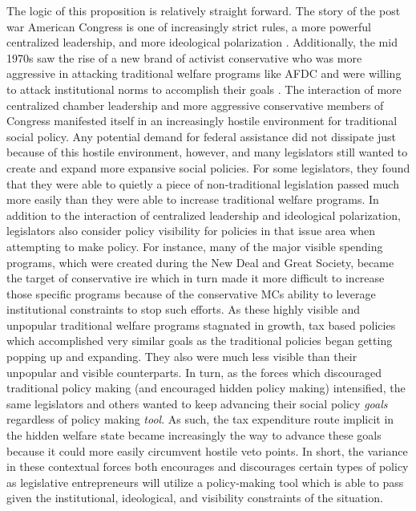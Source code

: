 \documentclass[12pt]{article}
\begin{document}
The logic of this proposition is relatively straight forward. The story of the post war American Congress is one of increasingly strict rules, a more powerful centralized leadership, and more ideological polarization \citep{rohde1991, binder2003}. Additionally, the mid 1970s saw the rise of a new brand of activist conservative who was more aggressive in attacking traditional welfare programs like AFDC and were willing to attack institutional norms to accomplish their goals \citep{hacker2007, theriault2013}. The interaction of more centralized chamber leadership and more aggressive conservative members of Congress manifested itself in an increasingly hostile environment for traditional social policy. Any potential demand for federal assistance did not dissipate just because of this hostile environment, however, and many legislators still wanted to create and expand more expansive social policies. For some legislators, they found that they were able to quietly a piece of non-traditional legislation passed much more easily than they were able to increase traditional welfare programs. In addition to the interaction of centralized leadership and ideological polarization, legislators also consider policy visibility for policies in that issue area when attempting to make policy. For instance, many of the major visible spending programs, which were created during the New Deal and Great Society, became the target of conservative ire which in turn made it more difficult to increase those specific programs because of the conservative MCs ability to leverage institutional constraints to stop such efforts. As these highly visible and unpopular traditional welfare programs stagnated in growth, tax based policies which accomplished very similar goals as the traditional policies began getting popping up and expanding. They also were much less visible than their unpopular and visible counterparts. In turn, as the forces which discouraged traditional policy making (and encouraged hidden policy making) intensified, the same legislators and others wanted to keep advancing their social policy \emph{goals} regardless of policy making \emph{tool}. As such, the tax expenditure route implicit in the hidden welfare state became increasingly the way to advance these goals because it could more easily circumvent hostile veto points. In short, the variance in these contextual forces both encourages and discourages certain types of policy as legislative entrepreneurs will utilize a policy-making tool which is able to pass given the institutional, ideological, and visibility constraints of the situation.
\end{document}
